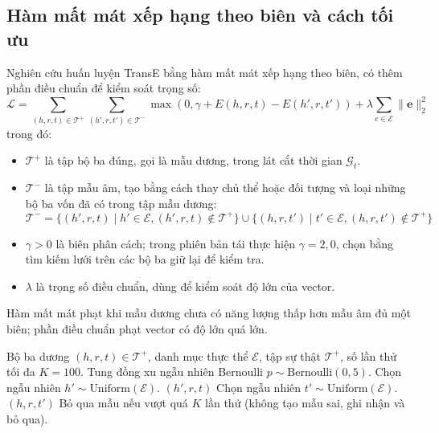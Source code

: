 \subsection{Hàm mất mát xếp hạng theo biên và cách tối ưu}
Nghiên cứu huấn luyện TransE bằng hàm mất mát xếp hạng theo biên, có thêm phần điều chuẩn để kiểm soát trọng số:
\begin{equation}
\mathcal{L} = \sum_{(h,r,t) \in \mathcal{T}^+} \sum_{(h',r,t') \in \mathcal{T}^-} \max\left(0, \gamma + E(h,r,t) - E(h',r,t')\right) + \lambda \sum_{e \in \mathcal{E}} \|\mathbf{e}\|_2^2
\label{eq:margin_ranking_loss}
\end{equation}
trong đó:
\begin{itemize}
    \item $\mathcal{T}^+$ là tập bộ ba đúng, gọi là mẫu dương, trong lát cắt thời gian $\mathcal{G}_t$.
    \item $\mathcal{T}^-$ là tập mẫu âm, tạo bằng cách thay chủ thể hoặc đối tượng và loại những bộ ba vốn đã có trong tập mẫu dương:
    \begin{equation}
    \mathcal{T}^- = \{(h', r, t) \mid h' \in \mathcal{E}, (h', r, t) \notin \mathcal{T}^+\} \cup \{(h, r, t') \mid t' \in \mathcal{E}, (h, r, t') \notin \mathcal{T}^+\}
    \end{equation}
    \item $\gamma > 0$ là biên phân cách; trong phiên bản tái thực hiện $\gamma = 2{,}0$, chọn bằng tìm kiếm lưới trên các bộ ba giữ lại để kiểm tra.
    \item $\lambda$ là trọng số điều chuẩn, dùng để kiểm soát độ lớn của vector.
\end{itemize}
Hàm mất mát phạt khi mẫu dương chưa có năng lượng thấp hơn mẫu âm đủ một biên; phần điều chuẩn phạt vector có độ lớn quá lớn.
\begin{algorithm}[H]
\caption{Tạo bộ ba sai để luyện mô hình, có lọc để không lấy nhầm bộ ba đúng}
\label{alg:negative_sampling}
\begin{algorithmic}[1]
\Require Bộ ba dương $(h, r, t) \in \mathcal{T}^+$, danh mục thực thể $\mathcal{E}$, tập sự thật $\mathcal{T}^+$, số lần thử tối đa $K=100$.
\State Tung đồng xu ngẫu nhiên Bernoulli $p \sim \text{Bernoulli}(0{,}5)$.
     
        \State Chọn ngẫu nhiên $h' \sim \text{Uniform}(\mathcal{E})$.
         \Return $(h', r, t)$ \EndIf
    \Else {}
        \State Chọn ngẫu nhiên $t' \sim \text{Uniform}(\mathcal{E})$.
         \Return $(h, r, t')$ \EndIf
    \EndIf
\EndFor
\State \Return Bỏ qua mẫu nếu vượt quá $K$ lần thử (không tạo mẫu sai, ghi nhận và bỏ qua).
\end{algorithmic}
\end{algorithm}

